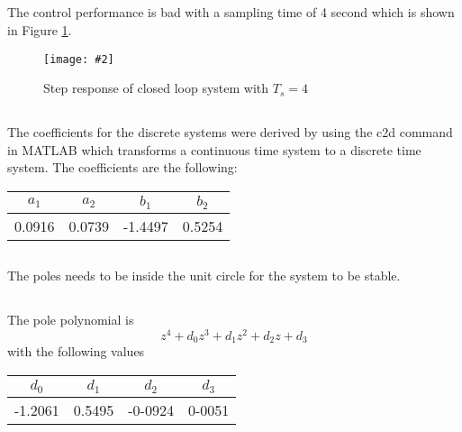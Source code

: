 \documentclass[12pt,a4paper]{article}
\newcommand{\fig}[4]{
    \begin{figure}[!h]
      \centering
      \texttt{[image: \#2]}
        \label{fig:#3}
        \caption{#4}
    \end{figure}
}
\begin{document}
\subsection{}%

\subsection{}%
 The control performance is bad with a sampling time of 4 second which is shown in Figure \ref{fig:ex11}. 
 
\fig{0.4}{ex11.png}{ex11}{Step response of closed loop system with $T_s = 4$}
\subsection{}%

The coefficients for the discrete systems were derived by using the c2d command in MATLAB which transforms a continuous time system to a discrete time system. The coefficients are the following:
\begin{center}
	\begin{tabular}{| c | c | c | c |}
	\hline
	$a_1$ & $a_2$ & $b_1$ & $b_2$ \\
	\hline
	0.0916 & 0.0739 & -1.4497 & 0.5254 \\
	\hline
	\end{tabular}
\end{center}

\subsection{}%
The poles needs to be inside the unit circle for the system to be stable.

\subsection{}%
The pole polynomial is
	\begin{equation}
		z^4+d_0z^3+d_1z^2+d_2z +d_3
	\end{equation}
	with the following values
\begin{center}
	\begin{tabular}{| c | c | c | c |}
	\hline
	$d_0$ & $d_1$ & $d_2$ & $d_3$ \\
	\hline
	-1.2061 & 0.5495 & -0-0924 & 0-0051 \\
	\hline
	\end{tabular}
\end{center}
\end{document}

